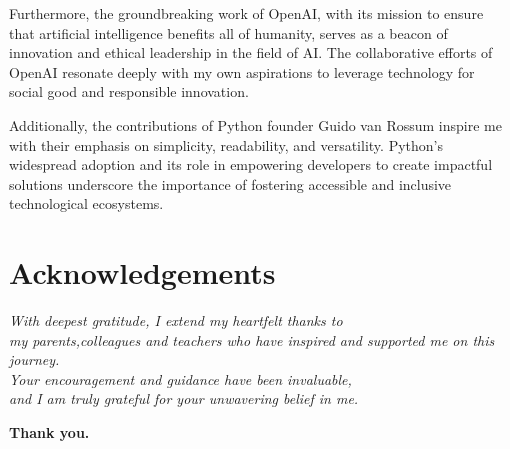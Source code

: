 \documentclass[12pt,a4paper]{article}
\begin{document}
Furthermore, the groundbreaking work of OpenAI, with its mission to ensure that artificial intelligence benefits all of humanity, serves as a beacon of innovation and ethical leadership in the field of AI. The collaborative efforts of OpenAI resonate deeply with my own aspirations to leverage technology for social good and responsible innovation.

Additionally, the contributions of Python founder Guido van Rossum inspire me with their emphasis on simplicity, readability, and versatility. Python's widespread adoption and its role in empowering developers to create impactful solutions underscore the importance of fostering accessible and inclusive technological ecosystems.

\section*{Acknowledgements}

\vspace{1em}

\begin{flushright}
\textit{With deepest gratitude, I extend my heartfelt thanks to}\\
\textit{my parents,colleagues and teachers who have inspired and supported me on this journey.}\\
\textit{Your encouragement and guidance have been invaluable,}\\
\textit{and I am truly grateful for your unwavering belief in me.}
\end{flushright}

\vspace{1em}

\begin{center}
\textbf{Thank you.}
\end{center}
\end{document}
